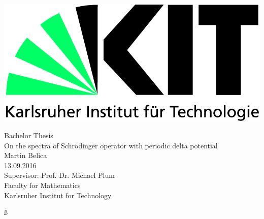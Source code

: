 \begin{titlepage}

    \includegraphics[scale=0.45,left]{kit-logo.jpg}  \\[2.5cm] 

	\begin{center}
 		{\Large Bachelor Thesis} \\[1cm] 
    
    	{\Huge On the spectra of Schrödinger operator with periodic delta potential } \\[1.5cm]

    	{\Large Martin Belica} \\[0.25cm]
    	{\Large 13.09.2016} \\[3.5cm]


    	{\Large Supervisor: Prof. Dr. Michael Plum} \\[0.75cm]
    	{\Large Faculty for Mathematics} \\[0.75cm]
    	{\Large Karlsruher Institut for Technology} \vfill 
  \end{center}

\end{titlepage}ß